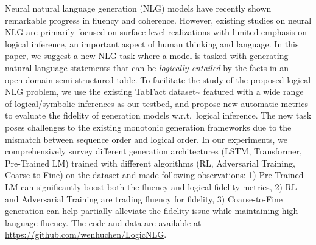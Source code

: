 Neural natural language generation (NLG) models have recently shown remarkable progress in fluency and coherence. However, existing studies on neural NLG are primarily focused on surface-level realizations with limited emphasis on logical inference, an important aspect of human thinking and language. In this paper, we suggest a new NLG task where a model is tasked with generating natural language statements that can be \emph{logically entailed} by the facts in an open-domain semi-structured table. To facilitate the study of the proposed logical NLG problem, we use the existing TabFact dataset{\textasciitilde}\cite{chen2019tabfact} featured with a wide range of logical/symbolic inferences as our testbed, and propose new automatic metrics to evaluate the fidelity of generation models w.r.t.\ logical inference. The new task poses challenges to the existing monotonic generation frameworks due to the mismatch between sequence order and logical order. In our experiments, we comprehensively survey different generation architectures (LSTM, Transformer, Pre-Trained LM) trained with different algorithms  (RL, Adversarial Training, Coarse-to-Fine) on the dataset and made following observations: 1) Pre-Trained LM can significantly boost both the fluency and logical fidelity metrics, 2) RL and Adversarial Training are trading fluency for fidelity, 3) Coarse-to-Fine generation can help partially alleviate the fidelity issue while maintaining high language fluency. The code and data are available at \url{https://github.com/wenhuchen/LogicNLG}.
